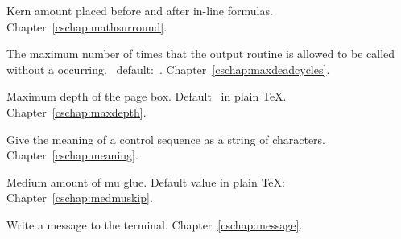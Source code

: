 \begin{glossinventory}
\item [\cs{mathsurround}]
      Kern amount placed before and after in-line formulas.
Chapter~\ref{cschap:mathsurround}.

\item [\cs{maxdeadcycles}]
      The maximum number of times that the output routine is allowed to
      be called without a  occurring.
      \IniTeX\ default:~.
Chapter~\ref{cschap:maxdeadcycles}.

\item [\cs{maxdepth}]
      Maximum depth of the page box.
      Default~\n{4pt} in plain \TeX.
Chapter~\ref{cschap:maxdepth}.

\item [\cs{meaning}]
      Give the meaning of a control sequence as a string of characters.
Chapter~\ref{cschap:meaning}.

\item [\cs{medmuskip}]
      Medium amount of mu glue.
      Default value in plain \TeX: 
Chapter~\ref{cschap:medmuskip}.

% 
\item [\cs{message\gr{general text}}]
      Write a message to the terminal.
     Chapter~\ref{cschap:message}.
 

\end{glossinventory}
